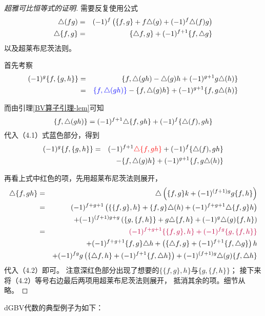 \begin{proof}[超雅可比恒等式的证明]
需要反复使用公式
\begin{eqnarray*}
\triangle(fg)&=&(-1)^f\left(\{f,g\}+f\triangle(g)+(-1)^f\triangle(f)g\right)\\
\triangle\{f,g\}&=&\{\triangle f,g\}+(-1)^{f+1}\{f,\triangle g\}
\end{eqnarray*}
以及超莱布尼茨法则。

首先考察
\begin{eqnarray}
     (-1)^g\{f,\{g,h\}\}\nonumber
&=&
     \{f,\triangle(gh)-\triangle(g)h+(-1)^{g+1}g\triangle(h)\}\nonumber\\
&=&
     {\color{blue}
       \{f,\triangle(gh)\}
     }
    -\{f,\triangle(g)h\}
    +(-1)^{g+1}\{f,g\triangle(h)\}
\end{eqnarray}

而由引理\ref{BV算子引理-lem}可知
$$\{f,\triangle(gh)\}=(-1)^{f+1}\triangle\{f,gh\}+(-1)^f\{\triangle(f),gh\}$$
代入（4.1）式蓝色部分，得到
\begin{eqnarray}
     (-1)^g\{f,\{g,h\}\}\nonumber
&=&
     (-1)^{f+1}
     {\color{red}
      \triangle\{f,gh\}
     }
    +(-1)^f\{\triangle(f),gh\}\nonumber\\
& &
    -\{f,\triangle(g)h\}
    +(-1)^{g+1}\{f,g\triangle(h)\}
\end{eqnarray}

再看上式中红色的项，先用超莱布尼茨法则展开，
\begin{eqnarray*}
     \triangle\{f,gh\}
&=&
     \triangle
     \left(
       \{f,g\}k+(-1)^{(f+1)g}g\{f,h\}
     \right)\\
&=&
     (-1)^{f+g+1}
     \left(
       \{\{f,g\},h\}
      +\{f,g\}\triangle(h)
      +(-1)^{f+g+1}\triangle\{f,g\}h
     \right)\\
& &
    +(-1)^{(f+1)g+g}
     \left(
       \{g,\{f,h\}\}
      +g\triangle\{f,h\}
      +(-1)^g\triangle(g)\{f,h\}
     \right)\\
&=&
     {\color{purple}
       (-1)^{f+g+1}\{\{f,g\},h\}
      +(-1)^{fg}\{g,\{f,h\}\}
     }\\
& &
    +(-1)^{f+g+1}\{f,g\}\triangle h
    +\left(
       \{\triangle f,g\}+(-1)^{f+1}\{f,\triangle g\}
     \right)h\\
& &
    +(-1)^{fg}g
     \left(
       \{\triangle f,h\}+(-1)^{f+1}\{f,\triangle h\}
     \right)
    +(-1)^{(f+1)g}\triangle(g)\{f,\triangle h\}
\end{eqnarray*}
代入（4.2）即可。
注意深红色部分出现了想要的$\{\{f,g\},h\}$与$\{g,\{f,h\}\}$；
接下来将（4.2）等号右边最后两项用超莱布尼茨法则展开，
抵消其余的项。细节从略。
\end{proof}

dGBV代数的典型例子为如下：

